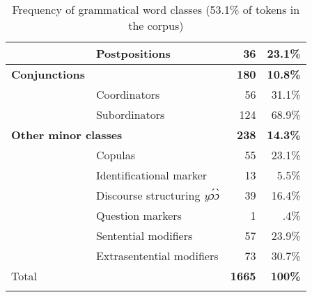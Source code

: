 \begin{table}
{\begin{tabular}{ll rr}
 & Postpositions   &   36 & 23.1\% \\
 \midrule
 {\bfseries Conjunctions} &  & {\bfseries 180} &  {\bfseries 10.8\%} \\
 \midrule
 & Coordinators   &   56 & 31.1\% \\
 & Subordinators   &   124 & 68.9\% \\
 \midrule
 \multicolumn{2}{l}{\bfseries Other minor classes}  & {\bfseries 238} &  {\bfseries 14.3\%} \\
 \midrule
 & Copulas  &   55 & 23.1\% \\
 & Identificational marker  &    13 & 5.5\% \\
  & Discourse structuring {\itshape yɔ́ɔ̀}  &   39 & 16.4\% \\
 & Question markers  &    1 & .4\% \\
 & Sentential modifiers  &   57 & 23.9\% \\
 & Extrasentential modifiers  &    73 & 30.7\% \\
 \midrule
  Total & & \textbf{1665} & \textbf{100\%} \\ %
 \lspbottomrule
\end{tabular}
}
\caption{Frequency of grammatical word classes (53.1\% of tokens in the corpus)}
\label{Tab:POSnogram}
\end{table}




